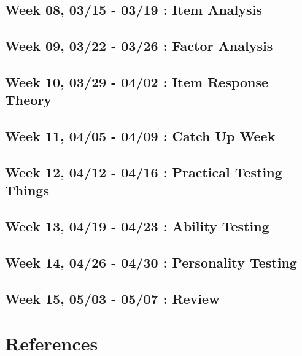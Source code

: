 \documentclass[11pt,]{article}
\begin{document}
\hypertarget{week-08-0315---0319-item-analysis}{%
\subsection{Week 08, 03/15 - 03/19 : Item
Analysis}\label{week-08-0315---0319-item-analysis}}

\hypertarget{week-09-0322---0326-factor-analysis}{%
\subsection{Week 09, 03/22 - 03/26 : Factor
Analysis}\label{week-09-0322---0326-factor-analysis}}

\hypertarget{week-10-0329---0402-item-response-theory}{%
\subsection{Week 10, 03/29 - 04/02 : Item Response
Theory}\label{week-10-0329---0402-item-response-theory}}

\hypertarget{week-11-0405---0409-catch-up-week}{%
\subsection{Week 11, 04/05 - 04/09 : Catch Up
Week}\label{week-11-0405---0409-catch-up-week}}

\hypertarget{week-12-0412---0416-practical-testing-things}{%
\subsection{Week 12, 04/12 - 04/16 : Practical Testing
Things}\label{week-12-0412---0416-practical-testing-things}}

\hypertarget{week-13-0419---0423-ability-testing}{%
\subsection{Week 13, 04/19 - 04/23 : Ability
Testing}\label{week-13-0419---0423-ability-testing}}

\hypertarget{week-14-0426---0430-personality-testing}{%
\subsection{Week 14, 04/26 - 04/30 : Personality
Testing}\label{week-14-0426---0430-personality-testing}}

\hypertarget{week-15-0503---0507-review}{%
\subsection{Week 15, 05/03 - 05/07 :
Review}\label{week-15-0503---0507-review}}

\hypertarget{references}{%
\section*{References}\label{references}}
\end{document}
